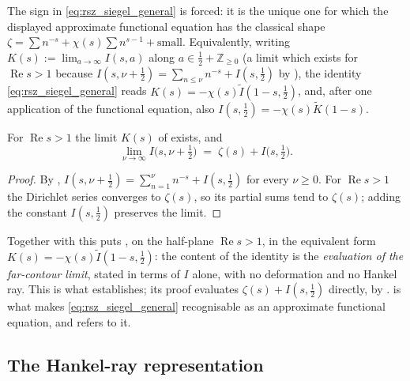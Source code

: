\begin{remark}
\label{rem:rsz_signcheck}
The sign in \eqref{eq:rsz_siegel_general} is forced: it is the unique one for which the
displayed approximate functional equation has the classical shape
$\zeta=\sum n^{-s}+\chi(s)\sum n^{s-1}+\text{small}$.  Equivalently, writing
$K(s):=\lim_{a\to\infty}I(s,a)$ along $a\in\tfrac12+\mathbb{Z}_{\ge0}$ (a limit which
exists for $\operatorname{Re}s>1$ because $I(s,\nu+\tfrac12)=\sum_{n\le\nu}n^{-s}+I(s,\tfrac12)$
by ), the identity \eqref{eq:rsz_siegel_general} reads
$K(s)=-\chi(s)\widetilde I(1-s,\tfrac12)$, and, after one application of the functional
equation, also $I(s,\tfrac12)=-\chi(s)\widetilde K(1-s)$.
\end{remark}

\begin{lemma}
\label{lem:rsz_limit}
\leanok
{}
For $\operatorname{Re}s>1$ the limit $K(s)$ of  exists, and
\[
  \lim_{\nu\to\infty}I\bigl(s,\nu+\tfrac12\bigr)\;=\;\zeta(s)+I\bigl(s,\tfrac12\bigr).
\]
\end{lemma}

\begin{proof}
\leanok
{}
By , $I(s,\nu+\tfrac12)=\sum_{n=1}^{\nu}n^{-s}+I(s,\tfrac12)$ for every
$\nu\ge0$.  For $\operatorname{Re}s>1$ the Dirichlet series converges to $\zeta(s)$, so its
partial sums tend to $\zeta(s)$; adding the constant $I(s,\tfrac12)$ preserves the limit.
\end{proof}

Together with  this puts , on the half-plane
$\operatorname{Re}s>1$, in the equivalent form $K(s)=-\chi(s)\widetilde I(1-s,\tfrac12)$: the
content of the identity is the \emph{evaluation of the far-contour limit}, stated in terms of
$I$ alone, with no deformation and no Hankel ray.  This is what 
establishes; its proof evaluates $\zeta(s)+I(s,\tfrac12)$ directly, by .
 is what makes \eqref{eq:rsz_siegel_general} recognisable as an
approximate functional equation, and  refers to it.

\subsection{The Hankel-ray representation}

